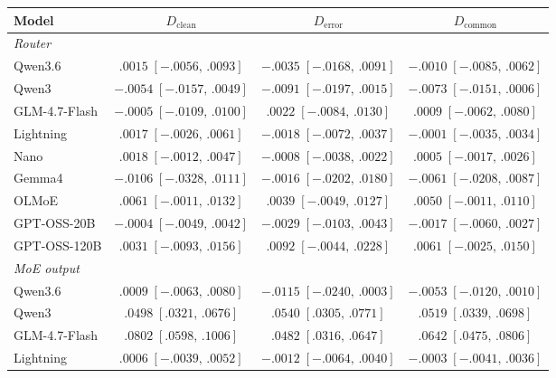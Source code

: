 \begingroup
\fontsize{9}{10.5}\selectfont
\setlength{\tabcolsep}{2.5pt}
\renewcommand{\arraystretch}{1.15}
\begin{tabular*}{\linewidth}{@{\extracolsep{\fill}}lccc@{}}
\toprule
Model & \(D_{\mathrm{clean}}\) & \(D_{\mathrm{error}}\) & \(D_{\mathrm{common}}\) \\
\midrule
\multicolumn{4}{l}{\textit{Router}} \\[1pt]
Qwen3.6 & \(.0015\;[-.0056,\,.0093]\) & \(-.0035\;[-.0168,\,.0091]\) & \(-.0010\;[-.0085,\,.0062]\)\\[1pt]
Qwen3 & \(-.0054\;[-.0157,\,.0049]\) & \(-.0091\;[-.0197,\,.0015]\) & \(-.0073\;[-.0151,\,.0006]\)\\[1pt]
GLM-4.7-Flash & \(-.0005\;[-.0109,\,.0100]\) & \(.0022\;[-.0084,\,.0130]\) & \(.0009\;[-.0062,\,.0080]\)\\[1pt]
Lightning & \(.0017\;[-.0026,\,.0061]\) & \(-.0018\;[-.0072,\,.0037]\) & \(-.0001\;[-.0035,\,.0034]\)\\[1pt]
Nano & \(.0018\;[-.0012,\,.0047]\) & \(-.0008\;[-.0038,\,.0022]\) & \(.0005\;[-.0017,\,.0026]\)\\[1pt]
Gemma4 & \(-.0106\;[-.0328,\,.0111]\) & \(-.0016\;[-.0202,\,.0180]\) & \(-.0061\;[-.0208,\,.0087]\)\\[1pt]
OLMoE & \(.0061\;[-.0011,\,.0132]\) & \(.0039\;[-.0049,\,.0127]\) & \(.0050\;[-.0011,\,.0110]\)\\[1pt]
GPT-OSS-20B & \(-.0004\;[-.0049,\,.0042]\) & \(-.0029\;[-.0103,\,.0043]\) & \(-.0017\;[-.0060,\,.0027]\)\\[1pt]
GPT-OSS-120B & \(.0031\;[-.0093,\,.0156]\) & \(.0092\;[-.0044,\,.0228]\) & \(.0061\;[-.0025,\,.0150]\)\\[1pt]
\midrule
\multicolumn{4}{l}{\textit{MoE output}} \\[1pt]
Qwen3.6 & \(.0009\;[-.0063,\,.0080]\) & \(-.0115\;[-.0240,\,.0003]\) & \(-.0053\;[-.0120,\,.0010]\)\\[1pt]
Qwen3 & \(.0498\;[.0321,\,.0676]\) & \(.0540\;[.0305,\,.0771]\) & \(.0519\;[.0339,\,.0698]\)\\[1pt]
GLM-4.7-Flash & \(.0802\;[.0598,\,.1006]\) & \(.0482\;[.0316,\,.0647]\) & \(.0642\;[.0475,\,.0806]\)\\[1pt]
Lightning & \(.0006\;[-.0039,\,.0052]\) & \(-.0012\;[-.0064,\,.0040]\) & \(-.0003\;[-.0041,\,.0036]\)\\[1pt]

\end{tabular*}
